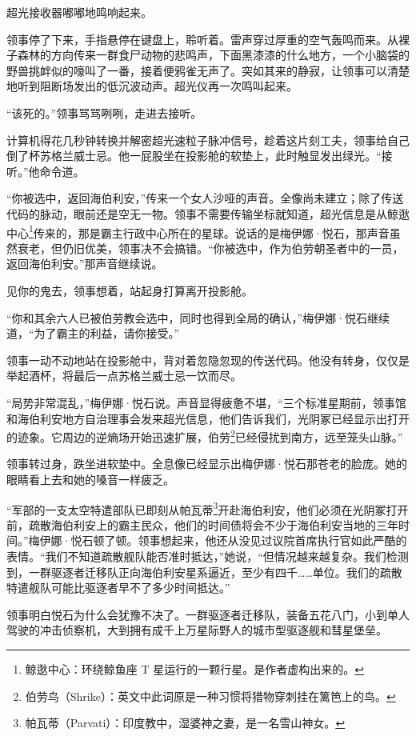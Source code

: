 \documentclass[AutoFakeBold=true]{book}
\begin{document}
超光接收器嘟嘟地鸣响起来。

领事停了下来，手指悬停在键盘上，聆听着。雷声穿过厚重的空气轰鸣而来。从裸子森林的方向传来一群食尸动物的悲鸣声，下面黑漆漆的什么地方，一个小脑袋的野兽挑衅似的嚎叫了一番，接着便鸦雀无声了。突如其来的静寂，让领事可以清楚地听到阻断场发出的低沉波动声。超光仪再一次鸣叫起来。

``该死的。''领事骂骂咧咧，走进去接听。

计算机得花几秒钟转换并解密超光速粒子脉冲信号，趁着这片刻工夫，领事给自己倒了杯苏格兰威士忌。他一屁股坐在投影舱的软垫上，此时触显发出绿光。``接听。''他命令道。

``你被选中，返回海伯利安，''传来一个女人沙哑的声音。全像尚未建立；除了传送代码的脉动，眼前还是空无一物。领事不需要传输坐标就知道，超光信息是从鲸逖中心\footnote{鲸逖中心：环绕鲸鱼座 T 星运行的一颗行星。是作者虚构出来的。}传来的，那是霸主行政中心所在的星球。说话的是梅伊娜·悦石，那声音虽然衰老，但仍旧优美，领事决不会搞错。``你被选中，作为伯劳朝圣者中的一员，返回海伯利安。''那声音继续说。

{\kaishu 见你的鬼去}，领事想着，站起身打算离开投影舱。

``你和其余六人已被伯劳教会选中，同时也得到全局的确认，''梅伊娜·悦石继续道，``为了霸主的利益，请你接受。''

领事一动不动地站在投影舱中，背对着忽隐忽现的传送代码。他没有转身，仅仅是举起酒杯，将最后一点苏格兰威士忌一饮而尽。

``局势非常混乱，''梅伊娜·悦石说。声音显得疲惫不堪，``三个标准星期前，领事馆和海伯利安地方自治理事会发来超光信息，他们告诉我们，光阴冢已经显示出打开的迹象。它周边的逆熵场开始迅速扩展，伯劳\footnote{伯劳鸟（Shrike）：英文中此词原是一种习惯将猎物穿刺挂在篱笆上的鸟。}已经侵扰到南方，远至笼头山脉。''

领事转过身，跌坐进软垫中。全息像已经显示出梅伊娜·悦石那苍老的脸庞。她的眼睛看上去和她的嗓音一样疲乏。

``军部的一支太空特遣部队已即刻从帕瓦蒂\footnote{帕瓦蒂（Parvati）：印度教中，湿婆神之妻，是一名雪山神女。}开赴海伯利安，他们必须在光阴冢打开前，疏散海伯利安上的霸主民众，他们的时间债将会不少于海伯利安当地的三年时间。''梅伊娜·悦石顿了顿。领事想起来，他还从没见过议院首席执行官如此严酷的表情。``我们不知道疏散舰队能否准时抵达，''她说，``但情况越来越复杂。我们检测到，一群驱逐者迁移队正向海伯利安星系逼近，至少有四千……单位。我们的疏散特遣舰队可能比驱逐者早不了多少时间抵达。''

领事明白悦石为什么会犹豫不决了。一群驱逐者迁移队，装备五花八门，小到单人驾驶的冲击侦察机，大到拥有成千上万星际野人的城市型驱逐舰和彗星堡垒。
\end{document}

